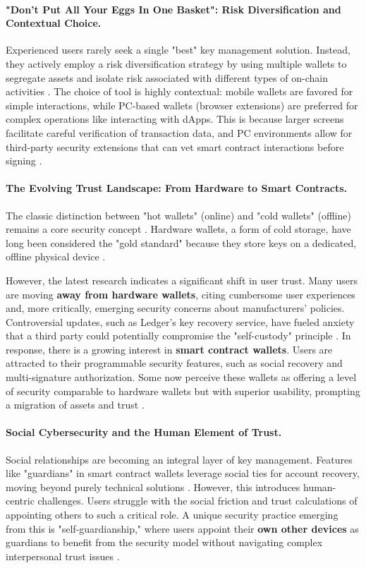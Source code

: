 \paragraph{"Don't Put All Your Eggs In One Basket": Risk Diversification and Contextual Choice.}
Experienced users rarely seek a single "best" key management solution. Instead, they actively employ a risk diversification strategy by using multiple wallets to segregate assets and isolate risk associated with different types of on-chain activities \cite{yu2024}. The choice of tool is highly contextual: mobile wallets are favored for simple interactions, while PC-based wallets (browser extensions) are preferred for complex operations like interacting with dApps. This is because larger screens facilitate careful verification of transaction data, and PC environments allow for third-party security extensions that can vet smart contract interactions before signing \cite{yu2024}.

\paragraph{The Evolving Trust Landscape: From Hardware to Smart Contracts.}
The classic distinction between "hot wallets" (online) and "cold wallets" (offline) remains a core security concept \cite{suratkar2020}. Hardware wallets, a form of cold storage, have long been considered the "gold standard" because they store keys on a dedicated, offline physical device \cite{suratkar2020}.

However, the latest research indicates a significant shift in user trust. Many users are moving \textbf{away from hardware wallets}, citing cumbersome user experiences and, more critically, emerging security concerns about manufacturers' policies. Controversial updates, such as Ledger's key recovery service, have fueled anxiety that a third party could potentially compromise the "self-custody" principle \cite{yu2024}. In response, there is a growing interest in \textbf{smart contract wallets}. Users are attracted to their programmable security features, such as social recovery and multi-signature authorization. Some now perceive these wallets as offering a level of security comparable to hardware wallets but with superior usability, prompting a migration of assets and trust \cite{yu2024}.

\paragraph{Social Cybersecurity and the Human Element of Trust.}
Social relationships are becoming an integral layer of key management. Features like "guardians" in smart contract wallets leverage social ties for account recovery, moving beyond purely technical solutions \cite{yu2024}. However, this introduces human-centric challenges. Users struggle with the social friction and trust calculations of appointing others to such a critical role. A unique security practice emerging from this is "self-guardianship," where users appoint their \textbf{own other devices} as guardians to benefit from the security model without navigating complex interpersonal trust issues \cite{yu2024}.